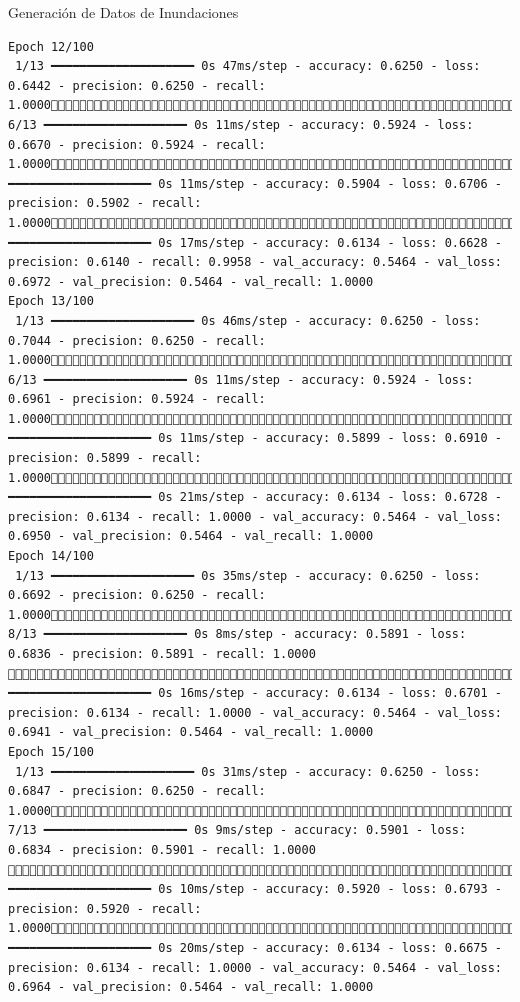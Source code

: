 \documentclass[
  ignorenonframetext,
]{beamer}
\begin{document}
\begin{frame}[fragile]{Generación de Datos de Inundaciones}
\begin{verbatim}
Epoch 12/100
 1/13 ━━━━━━━━━━━━━━━━━━━━ 0s 47ms/step - accuracy: 0.6250 - loss: 0.6442 - precision: 0.6250 - recall: 1.0000 6/13 ━━━━━━━━━━━━━━━━━━━━ 0s 11ms/step - accuracy: 0.5924 - loss: 0.6670 - precision: 0.5924 - recall: 1.000011/13 ━━━━━━━━━━━━━━━━━━━━ 0s 11ms/step - accuracy: 0.5904 - loss: 0.6706 - precision: 0.5902 - recall: 1.000013/13 ━━━━━━━━━━━━━━━━━━━━ 0s 17ms/step - accuracy: 0.6134 - loss: 0.6628 - precision: 0.6140 - recall: 0.9958 - val_accuracy: 0.5464 - val_loss: 0.6972 - val_precision: 0.5464 - val_recall: 1.0000
Epoch 13/100
 1/13 ━━━━━━━━━━━━━━━━━━━━ 0s 46ms/step - accuracy: 0.6250 - loss: 0.7044 - precision: 0.6250 - recall: 1.0000 6/13 ━━━━━━━━━━━━━━━━━━━━ 0s 11ms/step - accuracy: 0.5924 - loss: 0.6961 - precision: 0.5924 - recall: 1.000011/13 ━━━━━━━━━━━━━━━━━━━━ 0s 11ms/step - accuracy: 0.5899 - loss: 0.6910 - precision: 0.5899 - recall: 1.000013/13 ━━━━━━━━━━━━━━━━━━━━ 0s 21ms/step - accuracy: 0.6134 - loss: 0.6728 - precision: 0.6134 - recall: 1.0000 - val_accuracy: 0.5464 - val_loss: 0.6950 - val_precision: 0.5464 - val_recall: 1.0000
Epoch 14/100
 1/13 ━━━━━━━━━━━━━━━━━━━━ 0s 35ms/step - accuracy: 0.6250 - loss: 0.6692 - precision: 0.6250 - recall: 1.0000 8/13 ━━━━━━━━━━━━━━━━━━━━ 0s 8ms/step - accuracy: 0.5891 - loss: 0.6836 - precision: 0.5891 - recall: 1.0000 13/13 ━━━━━━━━━━━━━━━━━━━━ 0s 16ms/step - accuracy: 0.6134 - loss: 0.6701 - precision: 0.6134 - recall: 1.0000 - val_accuracy: 0.5464 - val_loss: 0.6941 - val_precision: 0.5464 - val_recall: 1.0000
Epoch 15/100
 1/13 ━━━━━━━━━━━━━━━━━━━━ 0s 31ms/step - accuracy: 0.6250 - loss: 0.6847 - precision: 0.6250 - recall: 1.0000 7/13 ━━━━━━━━━━━━━━━━━━━━ 0s 9ms/step - accuracy: 0.5901 - loss: 0.6834 - precision: 0.5901 - recall: 1.0000 12/13 ━━━━━━━━━━━━━━━━━━━━ 0s 10ms/step - accuracy: 0.5920 - loss: 0.6793 - precision: 0.5920 - recall: 1.000013/13 ━━━━━━━━━━━━━━━━━━━━ 0s 20ms/step - accuracy: 0.6134 - loss: 0.6675 - precision: 0.6134 - recall: 1.0000 - val_accuracy: 0.5464 - val_loss: 0.6964 - val_precision: 0.5464 - val_recall: 1.0000

\end{verbatim}
\end{frame}
\end{document}
